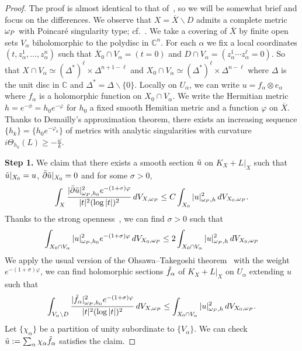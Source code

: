 \documentclass[a4paper, 11pt]{amsart}
\theoremstyle{plain}
\numberwithin{equation}{section} %
\numberwithin{figure}{section} %
\theoremstyle{plain}
\theoremstyle{plain}
\theoremstyle{plain}
\theoremstyle{plain}
\theoremstyle{remark}
\theoremstyle{definition}
\theoremstyle{definition}
\begin{document}
\begin{proof}
    The proof is almost identical to that of~\cite[Theorem 1.3]{cao17-OTtheorem},  so we will be somewhat brief and focus on the differences.   
    We observe that $X=\overline{X}\backslash D$ admits a complete metric $\omega_{\rm P}$ with Poincar\'e singularity type; cf.~\cite{Kobayashi84-KE-open}.  
    We take a covering of $\overline{X}$ by finite open sets $V_\alpha$ biholomorphic to the polydisc in $\mathbb{C}^n$. For each $\alpha$ we fix a local coordinates $(t,z^1_\alpha,\ldots,z^n_\alpha)$ such that $\overline{X}_0\cap V_\alpha=(t=0)$ and $D\cap V_\alpha=(z_\alpha^1\cdots z_\alpha^\ell=0)$. So that $X\cap V_\alpha\simeq (\Delta^*)^\ell\times\Delta^{n+1-\ell}$ and 
    $ X_0\cap V_\alpha\simeq (\Delta^*)^\ell\times\Delta^{n-\ell}$ where $\Delta$ is the unit disc in $\mathbb{C}$ and $\Delta^*=\Delta\backslash \{0\}$.
    Locally on $U_\alpha$, we can write $u=f_\alpha\otimes e_\alpha$ where $f_\alpha$ is a holomorphic function on $X_0\cap V_\alpha$. We write the Hermitian metric $h=e^{-\phi}=h_0e^{-\varphi}$ for $h_0$ a fixed smooth Hemitian metric and a function $\varphi$ on $\overline{X}$. 
Thanks to Demailly's approximation theorem, there exists an increasing sequence $\{h_k\}=\{h_0e^{-\varphi_k}\}$ of metrics with analytic singularities with curvature $i\Theta_{h_k}(L)\geq -\frac{\omega}{k}$.

\smallskip
    \textbf{Step 1.} We claim that there exists a smooth section $\Tilde u$ on $K_X+L|_X$ such that $\Tilde{u}|_{X_0}=u$, $\Bar{\partial} \Tilde{u}|_{X_0}=0$ and for some $\sigma>0$, 
    \[ \int_X\frac{|\Bar{\partial}\Tilde{u}|^2_{\omega_{\rm P},h_0}e^{-(1+\sigma)\varphi}}{|t|^2(\log|t|)^2} \,{\rm d}V_{X,\omega_{\rm P}} \leq C\int_{X_0} |u|^2_{\omega_{\rm P},h}\, {\rm d}V_{X_0,\omega_{\rm P}}. \]
Thanks to  the strong openness~\cite{Guan-Zhou15-strong-openness}, we can find $\sigma>0$ such that
\[\int_{X_0\cap V_\alpha}|u|^2_{\omega_{\rm P},h_0}e^{-(1+\sigma)\varphi}\, {\rm d}V_{X_0,\omega_{\rm P}} \leq  2\int_{X_0\cap V_\alpha}|u|^2_{\omega_{\rm P},h} \, {\rm d}V_{X_0,\omega_{\rm P}} \]
    We apply the usual version of the Ohsawa–Takegoshi theorem~\cite[Theorem 13.6]{Deamilly-book-analytic} with the weight $e^{-(1+\sigma)\varphi}$, we can find holomorphic sections $\Tilde f_\alpha$ of $K_X+L|_X$ on $U_\alpha$ extending $u$ such that 
    \[\int_{V_\alpha\backslash D}\frac{|\Tilde f_\alpha|^2_{\omega_{\rm P},h_0}e^{-(1+\sigma)\varphi}}{|t|^2(\log|t|)^2}\, {\rm d}V_{X,\omega_{\rm P}} \leq\int_{X_0\cap V_\alpha} |u|^2_{\omega_{\rm P},h} \,{\rm d} V_{X_0,\omega_{\rm P}}. \]
Let $\{\chi_\alpha\}$ be a partition of unity
subordinate to $\{V_\alpha\}$. We can check $\Tilde{u}:=\sum_\alpha\chi_\alpha \Tilde{f}_\alpha$ satisfies the claim.


\end{proof}
\end{document}
